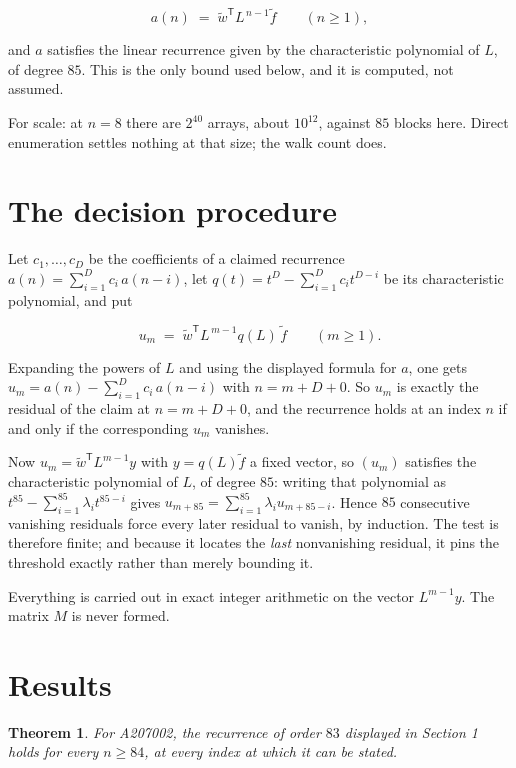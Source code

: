 \documentclass[11pt]{article}
\newtheorem{theorem}{Theorem}
\theoremstyle{definition}
\begin{document}
\[a(n) \;=\; \tilde w^{\mathsf T} L^{\,n-1} \tilde f \qquad (n \ge 1),\]

and $a$ satisfies the linear recurrence given by the characteristic polynomial of $L$, of degree $85$. This is the only bound used below, and it is computed, not assumed.

For scale: at $n = 8$ there are $2^{40}$ arrays, about $10^{12}$, against $85$ blocks here. Direct enumeration settles nothing at that size; the walk count does.

\section{The decision procedure}

Let $c_1,\dots,c_D$ be the coefficients of a claimed recurrence $a(n) = \sum_{i=1}^{D} c_i\,a(n-i)$, let $q(t) = t^{D} - \sum_{i=1}^{D} c_i t^{D-i}$ be its characteristic polynomial, and put

\[u_m \;=\; \tilde w^{\mathsf T} L^{\,m-1} q(L)\,\tilde f \qquad (m \ge 1).\]

Expanding the powers of $L$ and using the displayed formula for $a$, one gets $u_m = a(n) - \sum_{i=1}^{D} c_i\,a(n-i)$ with $n = m + D + 0$. So $u_m$ is exactly the residual of the claim at $n = m + D + 0$, and the recurrence holds at an index $n$ if and only if the corresponding $u_m$ vanishes.

Now $u_m = \tilde w^{\mathsf T} L^{m-1} y$ with $y = q(L)\tilde f$ a fixed vector, so $(u_m)$ satisfies the characteristic polynomial of $L$, of degree $85$: writing that polynomial as $t^{85} - \sum_{i=1}^{85} \lambda_i t^{85-i}$ gives $u_{m+85} = \sum_{i=1}^{85} \lambda_i u_{m+85-i}$. Hence $85$ consecutive vanishing residuals force every later residual to vanish, by induction. The test is therefore finite; and because it locates the {\itshape last} nonvanishing residual, it pins the threshold exactly rather than merely bounding it.

Everything is carried out in exact integer arithmetic on the vector $L^{m-1}y$. The matrix $M$ is never formed.

\section{Results}

\begin{theorem} For A207002, the recurrence of order $83$ displayed in Section 1 holds for every $n \ge 84$, at every index at which it can be stated.\end{theorem}
\end{document}
